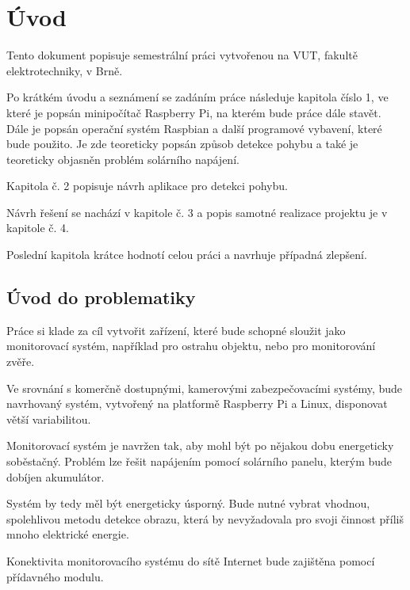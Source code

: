 \chapter*{Úvod}
{}


Tento dokument popisuje semestrální práci vytvořenou na VUT, fakultě elektrotechniky, v Brně.

Po krátkém úvodu a seznámení se zadáním práce následuje kapitola číslo 1, ve které je popsán minipočítač Raspberry Pi, na kterém bude práce dále stavět. Dále je popsán operační systém Raspbian a další 
programové vybavení, které bude použito. Je zde teoreticky popsán způsob detekce pohybu a také je teoreticky objasněn problém solárního napájení.

Kapitola č. 2 popisuje návrh aplikace pro detekci pohybu.

Návrh řešení se nachází v kapitole č. 3 a popis samotné realizace projektu je v kapitole č. 4.  

Poslední kapitola krátce hodnotí celou práci a navrhuje případná zlepšení.

\section*{Úvod do problematiky}
Práce si klade za cíl vytvořit zařízení, které bude schopné sloužit jako monitorovací systém, například pro ostrahu objektu, nebo pro monitorování zvěře.

Ve srovnání s komerčně dostupnými, kamerovými zabezpečovacími systémy, bude navrhovaný systém, vytvořený na platformě Raspberry Pi a Linux, disponovat větší variabilitou.

Monitorovací systém je navržen tak, aby mohl být po nějakou dobu energeticky soběstačný. Problém lze řešit napájením pomocí solárního panelu, kterým bude dobíjen akumulátor.

Systém by tedy měl být energeticky úsporný. Bude nutné vybrat vhodnou, spolehlivou metodu detekce obrazu, která by nevyžadovala pro svoji činnost příliš mnoho elektrické energie.

Konektivita monitorovacího systému do sítě Internet bude zajištěna pomocí přídavného modulu. 